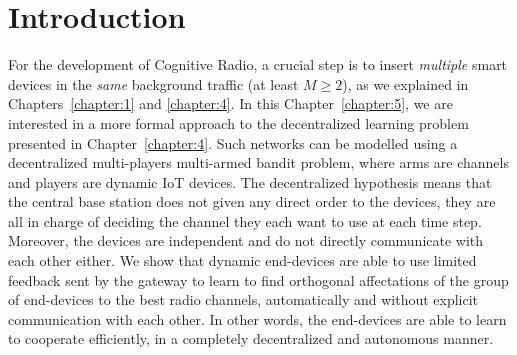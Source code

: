 


\section{Introduction}
\label{sec:5:introduction}

For the development of Cognitive Radio, a crucial step is to insert \emph{multiple} smart devices in the \emph{same} background traffic (at least $M \geq 2$), as we explained in Chapters~\ref{chapter:1} and \ref{chapter:4}.
%
In this Chapter~\ref{chapter:5}, we are interested in a more formal approach to the decentralized learning problem presented in Chapter~\ref{chapter:4}.
Such networks can be modelled using a decentralized multi-players multi-armed bandit problem, where arms are channels and players are dynamic IoT devices.
%
The decentralized hypothesis means that the central base station does not given any direct order to the devices, they are all in charge of deciding the channel they each want to use at each time step.
Moreover, the devices are independent and do not directly communicate with each other either.
We show that dynamic end-devices are able to use limited feedback sent by the gateway to learn to find orthogonal affectations of the group of end-devices to the best radio channels, automatically and without explicit communication with each other.
In other words, the end-devices are able to learn to cooperate efficiently, in a completely decentralized and autonomous manner.


